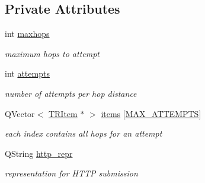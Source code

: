 \subsection*{Private Attributes}
\begin{CompactItemize}
\item 
\hypertarget{classTraceroute_2481668dffafbfa646e3db08b81a2e0d}{
int \hyperlink{classTraceroute_2481668dffafbfa646e3db08b81a2e0d}{maxhops}}
\label{classTraceroute_2481668dffafbfa646e3db08b81a2e0d}

\begin{CompactList}\small\item\em maximum hops to attempt \item\end{CompactList}\item 
\hypertarget{classTraceroute_132b16bab47e8fb2aeec79490551a669}{
int \hyperlink{classTraceroute_132b16bab47e8fb2aeec79490551a669}{attempts}}
\label{classTraceroute_132b16bab47e8fb2aeec79490551a669}

\begin{CompactList}\small\item\em number of attempts per hop distance \item\end{CompactList}\item 
\hypertarget{classTraceroute_2a3a2a7a2f73b2dd4fcb2e31aa7ac779}{
QVector$<$ \hyperlink{classTRItem}{TRItem} $\ast$ $>$ \hyperlink{classTraceroute_2a3a2a7a2f73b2dd4fcb2e31aa7ac779}{items} \mbox{[}\hyperlink{classTraceroute_4abb97c003bb8f524a8a1f2297762126}{MAX\_\-ATTEMPTS}\mbox{]}}
\label{classTraceroute_2a3a2a7a2f73b2dd4fcb2e31aa7ac779}

\begin{CompactList}\small\item\em each index contains all hops for an attempt \item\end{CompactList}\item 
\hypertarget{classTraceroute_ce66d8774bb8eac65102944ada9926fd}{
QString \hyperlink{classTraceroute_ce66d8774bb8eac65102944ada9926fd}{http\_\-repr}}
\label{classTraceroute_ce66d8774bb8eac65102944ada9926fd}

\begin{CompactList}\small\item\em representation for HTTP submission \item\end{CompactList}\end{CompactItemize}


